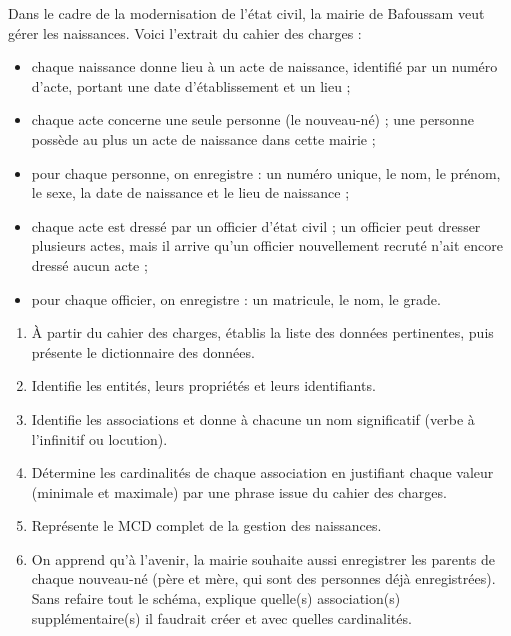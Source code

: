 \documentclass[11pt]{article}
\begin{document}
\begin{exercice}
Dans le cadre de la modernisation de l'état civil, la mairie de Bafoussam veut gérer les naissances. Voici l'extrait du cahier des charges :
\begin{itemize}
\item chaque naissance donne lieu à un acte de naissance, identifié par un numéro d'acte, portant une date d'établissement et un lieu ;
\item chaque acte concerne une seule personne (le nouveau-né) ; une personne possède au plus un acte de naissance dans cette mairie ;
\item pour chaque personne, on enregistre : un numéro unique, le nom, le prénom, le sexe, la date de naissance et le lieu de naissance ;
\item chaque acte est dressé par un officier d'état civil ; un officier peut dresser plusieurs actes, mais il arrive qu'un officier nouvellement recruté n'ait encore dressé aucun acte ;
\item pour chaque officier, on enregistre : un matricule, le nom, le grade.
\end{itemize}

\begin{enumerate}
\item À partir du cahier des charges, établis la liste des données pertinentes, puis présente le dictionnaire des données.
\item Identifie les entités, leurs propriétés et leurs identifiants.
\item Identifie les associations et donne à chacune un nom significatif (verbe à l'infinitif ou locution).
\item Détermine les cardinalités de chaque association en justifiant chaque valeur (minimale et maximale) par une phrase issue du cahier des charges.
\item Représente le MCD complet de la gestion des naissances.
\item On apprend qu'à l'avenir, la mairie souhaite aussi enregistrer les parents de chaque nouveau-né (père et mère, qui sont des personnes déjà enregistrées). Sans refaire tout le schéma, explique quelle(s) association(s) supplémentaire(s) il faudrait créer et avec quelles cardinalités.
\end{enumerate}
\end{exercice}
\end{document}

